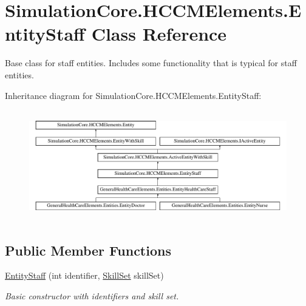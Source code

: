 \hypertarget{class_simulation_core_1_1_h_c_c_m_elements_1_1_entity_staff}{}\section{Simulation\+Core.\+H\+C\+C\+M\+Elements.\+Entity\+Staff Class Reference}
\label{class_simulation_core_1_1_h_c_c_m_elements_1_1_entity_staff}


Base class for staff entities. Includes some functionality that is typical for staff entities.  


Inheritance diagram for Simulation\+Core.\+H\+C\+C\+M\+Elements.\+Entity\+Staff\+:\begin{figure}[H]
\begin{center}
\leavevmode
\includegraphics[height=4.827586cm]{class_simulation_core_1_1_h_c_c_m_elements_1_1_entity_staff}
\end{center}
\end{figure}
\subsection*{Public Member Functions}
\begin{DoxyCompactItemize}
\item 
\hyperlink{class_simulation_core_1_1_h_c_c_m_elements_1_1_entity_staff_ad2ff24666597e6a82b3ae4634d9b4f23}{Entity\+Staff} (int identifier, \hyperlink{class_simulation_core_1_1_h_c_c_m_elements_1_1_skill_set}{Skill\+Set} skill\+Set)
\begin{DoxyCompactList}\small\item\em Basic constructor with identifiers and skill set. \end{DoxyCompactList}\end{DoxyCompactItemize}
